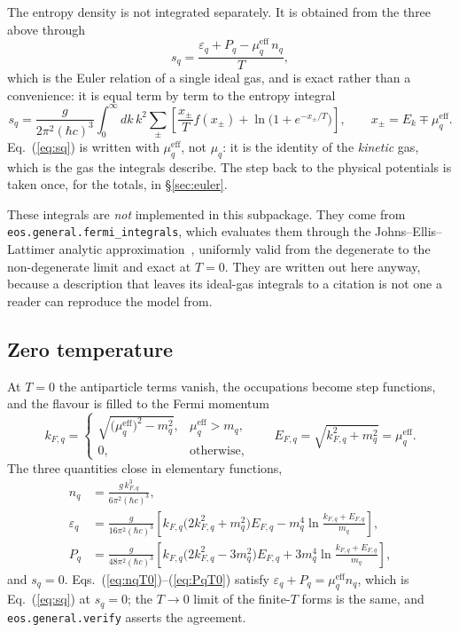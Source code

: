 \documentclass[aps,prc,onecolumn,superscriptaddress,nofootinbib,10pt]{revtex4-2}
\newcommand{\mueff}[1]{\mu^{\mathrm{eff}}_{#1}}
\newcommand{\hc}{(\hbar c)^3}
\begin{document}
The entropy density is not integrated separately. It is obtained from the
three above through
%
\begin{equation}
s_q = \frac{\varepsilon_q + P_q - \mueff{q}\, n_q}{T} ,
\label{eq:sq}
\end{equation}
%
which is the Euler relation of a single ideal gas, and is exact rather than a
convenience: it is equal term by term to the entropy integral
%
\begin{equation}
s_q = \frac{g}{2\pi^2 \hc} \int_0^\infty \! dk\, k^2
      \sum_{\pm} \left[ \frac{x_\pm}{T} f(x_\pm)
                        + \ln\!\big( 1 + e^{-x_\pm/T} \big) \right] ,
      \qquad x_\pm = E_k \mp \mueff{q} .
\label{eq:sqint}
\end{equation}
%
Eq.~(\ref{eq:sq}) is written with $\mueff{q}$, not $\mu_q$: it is the identity
of the \emph{kinetic} gas, which is the gas the integrals describe. The step
back to the physical potentials is taken once, for the totals, in
\S\ref{sec:euler}.

These integrals are \emph{not} implemented in this subpackage. They come from
\texttt{eos.general.fermi\_integrals}, which evaluates them through the
Johns--Ellis--Lattimer analytic approximation~\cite{JohnsEllisLattimer1996},
uniformly valid from the degenerate to the non-degenerate limit and exact at
$T = 0$. They are written out here anyway, because a description that leaves
its ideal-gas integrals to a citation is not one a reader can reproduce the
model from.

\subsection{Zero temperature}

At $T = 0$ the antiparticle terms vanish, the occupations become step
functions, and the flavour is filled to the Fermi momentum
%
\begin{equation}
k_{F,q} = \begin{cases}
  \sqrt{\big(\mueff{q}\big)^2 - m_q^2} , & \mueff{q} > m_q , \\[2pt]
  0 , & \text{otherwise} ,
\end{cases}
\qquad E_{F,q} = \sqrt{k_{F,q}^2 + m_q^2} = \mueff{q} .
\label{eq:kF}
\end{equation}
%
The three quantities close in elementary functions,
%
\begin{align}
n_q &= \frac{g\, k_{F,q}^3}{6\pi^2 \hc} ,
\label{eq:nqT0} \\
\varepsilon_q &= \frac{g}{16\pi^2 \hc}
   \left[ k_{F,q} \big( 2 k_{F,q}^2 + m_q^2 \big) E_{F,q}
        - m_q^4 \ln \frac{k_{F,q} + E_{F,q}}{m_q} \right] ,
\label{eq:epsqT0} \\
P_q &= \frac{g}{48\pi^2 \hc}
   \left[ k_{F,q} \big( 2 k_{F,q}^2 - 3 m_q^2 \big) E_{F,q}
        + 3 m_q^4 \ln \frac{k_{F,q} + E_{F,q}}{m_q} \right] ,
\label{eq:PqT0}
\end{align}
%
and $s_q = 0$. Eqs.~(\ref{eq:nqT0})--(\ref{eq:PqT0}) satisfy
$\varepsilon_q + P_q = \mueff{q} n_q$, which is Eq.~(\ref{eq:sq}) at
$s_q = 0$; the $T \to 0$ limit of the finite-$T$ forms is the same, and
\texttt{eos.general.verify} asserts the agreement.
\end{document}
